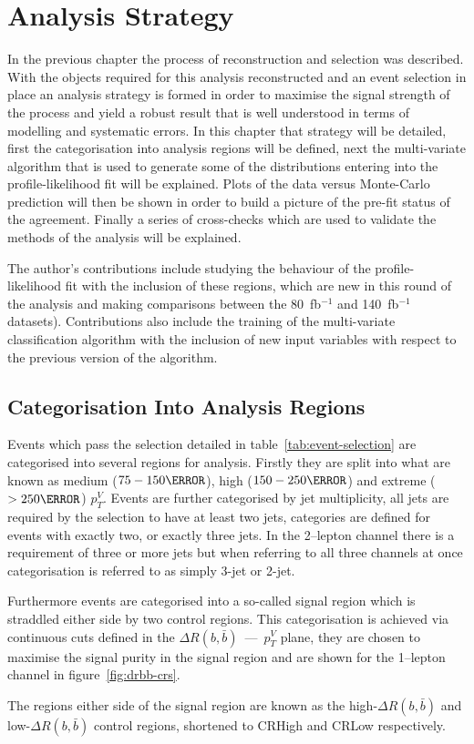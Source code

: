 \chapter{Analysis Strategy}%
\label{ch:strategy}
In the previous chapter the process of reconstruction and selection was
described. With the objects required for this analysis reconstructed and an
event selection in place an analysis strategy is formed in order to maximise the
signal strength of the \VHbb process and yield a robust result that is well
understood in terms of modelling and systematic errors. In this chapter that
strategy will be detailed, first the categorisation into analysis regions will
be defined, next the multi-variate algorithm that is used to generate some of
the distributions entering into the profile-likelihood fit will be explained.
Plots of the data versus Monte-Carlo prediction will then be shown in order to
build a picture of the pre-fit status of the agreement. Finally a series of
cross-checks which are used to validate the methods of the analysis will be
explained.

The author's contributions include studying the behaviour of the
profile-likelihood fit with the inclusion of these regions, which are new in
this round of the analysis and making comparisons between the 80~fb$^{-1}$ and
140~fb$^{-1}$ datasets). Contributions also include the training of the
multi-variate classification algorithm with the inclusion of new input variables
with respect to the previous version of the algorithm.

\section{Categorisation Into Analysis Regions}
\label{sec:ana-regions}

Events which pass the selection detailed in table~\ref{tab:event-selection} are
categorised into several regions for analysis. Firstly they are split into what
are known as medium ($75 - 150 \GeV$), high ($150 - 250 \GeV$) and extreme ($ >
250 \GeV$) $p_T^{V}$. Events are further categorised by jet multiplicity, all
jets are required by the selection to have at least two jets, categories are
defined for events with exactly two, or exactly three jets. In the 2--lepton
channel there is a requirement of three or more jets but when referring to all
three channels at once categorisation is referred to as simply 3-jet or 2-jet.

Furthermore events are categorised into a so-called signal region which is
straddled either side by two control regions. This categorisation is achieved
via continuous cuts defined in the $\Delta R(b, \bar{b})$~---~$p_T^{V}$ plane,
they are chosen to maximise the signal purity in the signal region and are shown
for the 1--lepton channel in figure~\ref{fig:drbb-crs}.

The regions either side of the signal region are known as the
high-$\Delta R(b, \bar{b})$ and low-$\Delta R(b, \bar{b})$ control regions,
shortened to CRHigh and CRLow respectively.

